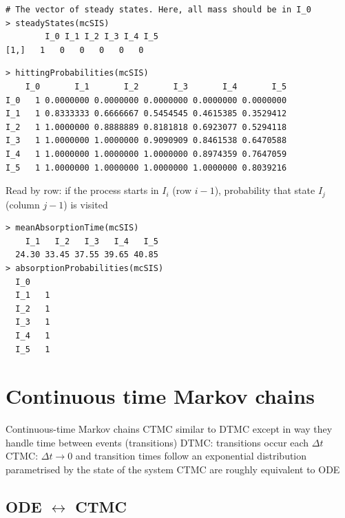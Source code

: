 \documentclass[aspectratio=169]{beamer}
\begin{document}
\begin{frame}[fragile]
\begin{lstlisting}
# The vector of steady states. Here, all mass should be in I_0
> steadyStates(mcSIS)
        I_0 I_1 I_2 I_3 I_4 I_5
[1,]   1   0   0   0   0   0    
\end{lstlisting}
\vfill
\begin{lstlisting}
> hittingProbabilities(mcSIS)
    I_0       I_1       I_2       I_3       I_4       I_5
I_0   1 0.0000000 0.0000000 0.0000000 0.0000000 0.0000000
I_1   1 0.8333333 0.6666667 0.5454545 0.4615385 0.3529412
I_2   1 1.0000000 0.8888889 0.8181818 0.6923077 0.5294118
I_3   1 1.0000000 1.0000000 0.9090909 0.8461538 0.6470588
I_4   1 1.0000000 1.0000000 1.0000000 0.8974359 0.7647059
I_5   1 1.0000000 1.0000000 1.0000000 1.0000000 0.8039216
\end{lstlisting}
Read by row: if the process starts in $I_i$ (row $i-1$), probability that state $I_j$ (column $j-1$) is visited
\end{frame}

\begin{frame}[fragile]
\begin{lstlisting}
> meanAbsorptionTime(mcSIS)
    I_1   I_2   I_3   I_4   I_5 
  24.30 33.45 37.55 39.65 40.85 
> absorptionProbabilities(mcSIS)
  I_0
  I_1   1
  I_2   1
  I_3   1
  I_4   1
  I_5   1      
\end{lstlisting}
\end{frame}

\section{Continuous time Markov chains}

\begin{frame}{Continuous-time Markov chains}
    CTMC similar to DTMC except in way they handle time between events (transitions)
\vfill
    DTMC: transitions occur each $\Delta t$
   \vfill 
    CTMC: $\Delta t\to 0$ and transition times follow an exponential distribution parametrised by the state of the system
    \vfill
    CTMC are roughly equivalent to ODE    
\end{frame}


\subsection{ODE $\leftrightarrow$ CTMC}
\end{document}
